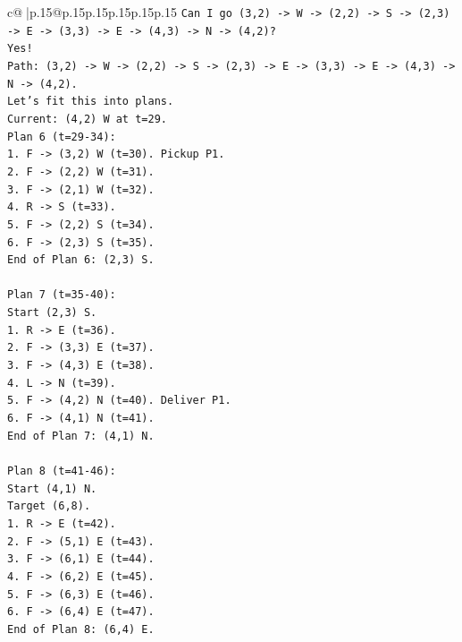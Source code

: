 \documentclass{article}
\begin{document}
{\begin{supertabular}{c@{$\;$}|p{.15\linewidth}@{}p{.15\linewidth}p{.15\linewidth}p{.15\linewidth}p{.15\linewidth}p{.15\linewidth}}
{{{\texttt{Can I go (3,2) {-}> W {-}> (2,2) {-}> S {-}> (2,3) {-}> E {-}> (3,3) {-}> E {-}> (4,3) {-}> N {-}> (4,2)?} \\
\texttt{Yes!} \\
\texttt{Path: (3,2) {-}> W {-}> (2,2) {-}> S {-}> (2,3) {-}> E {-}> (3,3) {-}> E {-}> (4,3) {-}> N {-}> (4,2).} \\
\texttt{Let's fit this into plans.} \\
\texttt{Current: (4,2) W at t=29.} \\
\texttt{Plan 6 (t=29{-}34):} \\
\texttt{1. F {-}> (3,2) W (t=30). Pickup P1.} \\
\texttt{2. F {-}> (2,2) W (t=31).} \\
\texttt{3. F {-}> (2,1) W (t=32).} \\
\texttt{4. R {-}> S (t=33).} \\
\texttt{5. F {-}> (2,2) S (t=34).} \\
\texttt{6. F {-}> (2,3) S (t=35).} \\
\texttt{End of Plan 6: (2,3) S.} \\
\\ 
\texttt{Plan 7 (t=35{-}40):} \\
\texttt{Start (2,3) S.} \\
\texttt{1. R {-}> E (t=36).} \\
\texttt{2. F {-}> (3,3) E (t=37).} \\
\texttt{3. F {-}> (4,3) E (t=38).} \\
\texttt{4. L {-}> N (t=39).} \\
\texttt{5. F {-}> (4,2) N (t=40). Deliver P1.} \\
\texttt{6. F {-}> (4,1) N (t=41).} \\
\texttt{End of Plan 7: (4,1) N.} \\
\\ 
\texttt{Plan 8 (t=41{-}46):} \\
\texttt{Start (4,1) N.} \\
\texttt{Target (6,8).} \\
\texttt{1. R {-}> E (t=42).} \\
\texttt{2. F {-}> (5,1) E (t=43).} \\
\texttt{3. F {-}> (6,1) E (t=44).} \\
\texttt{4. F {-}> (6,2) E (t=45).} \\
\texttt{5. F {-}> (6,3) E (t=46).} \\
\texttt{6. F {-}> (6,4) E (t=47).} \\
\texttt{End of Plan 8: (6,4) E.} \\
}}}
\end{supertabular}}
\end{document}
